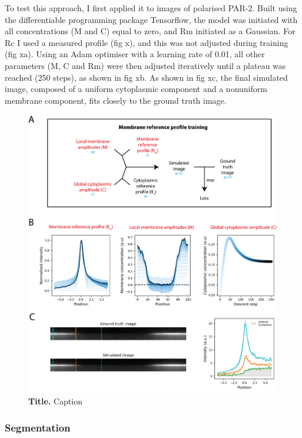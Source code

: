 \documentclass[12pt]{"article"}
\newcommand{\mycaption}[2]{\caption[#1]{\textbf{#1.} #2}}
\begin{document}
To test this approach, I first applied it to images of polarised PAR-2. Built using the differentiable programming package Tensorflow, the model was initiated with all concentrations (M and C) equal to zero, and Rm initiated as a Gaussian. For Rc I used a measured profile (fig x), and this was not adjusted during training (fig xa). Using an Adam optimiser with a learning rate of 0.01, all other parameters (M, C and Rm) were then adjusted iteratively until a plateau was reached (250 steps), as shown in fig xb. As shown in fig xc, the final simulated image, composed of a uniform cytoplasmic component and a nonuniform membrane component, fits closely to the ground truth image.\\


\begin{figure}[!h]
\includegraphics[scale=1]{memquant_membg_training}
\setlength{\abovecaptionskip}{20pt}
\centering
\mycaption{Title}{Caption}
\end{figure}


\subsubsection{Segmentation}
\end{document}
